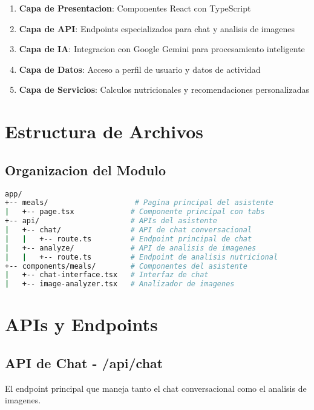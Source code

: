 \documentclass[12pt,a4paper]{article}
\begin{document}
\begin{enumerate}
    \item \textbf{Capa de Presentacion}: Componentes React con TypeScript
    \item \textbf{Capa de API}: Endpoints especializados para chat y analisis de imagenes
    \item \textbf{Capa de IA}: Integracion con Google Gemini para procesamiento inteligente
    \item \textbf{Capa de Datos}: Acceso a perfil de usuario y datos de actividad
    \item \textbf{Capa de Servicios}: Calculos nutricionales y recomendaciones personalizadas
\end{enumerate}

\section{Estructura de Archivos}

\subsection{Organizacion del Modulo}

\begin{lstlisting}[language=bash, caption=Estructura de archivos del Asistente Fitness]
app/
+-- meals/                    # Pagina principal del asistente
|   +-- page.tsx             # Componente principal con tabs
+-- api/                     # APIs del asistente
|   +-- chat/                # API de chat conversacional
|   |   +-- route.ts         # Endpoint principal de chat
|   +-- analyze/             # API de analisis de imagenes
|   |   +-- route.ts         # Endpoint de analisis nutricional
+-- components/meals/        # Componentes del asistente
|   +-- chat-interface.tsx   # Interfaz de chat
|   +-- image-analyzer.tsx   # Analizador de imagenes
\end{lstlisting}

\section{APIs y Endpoints}

\subsection{API de Chat - /api/chat}

El endpoint principal que maneja tanto el chat conversacional como el analisis de imagenes.
\end{document}
